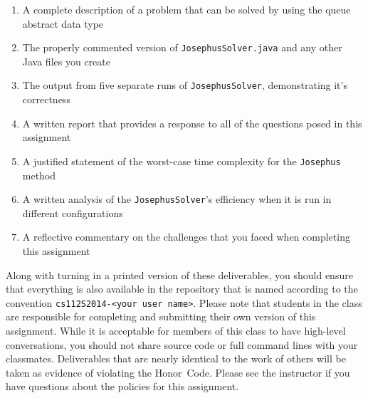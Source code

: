   \begin{enumerate} 
  \itemsep0pt

  \item A complete description of a problem that can be solved by using the queue abstract data type

  \item The properly commented version of {\tt JosephusSolver.java} and any other Java files you create

  \item The output from five separate runs of {\tt JosephusSolver}, demonstrating it's correctness 

  \item A written report that provides a response to all of the questions posed in this assignment

  \item A justified statement of the worst-case time complexity for the {\tt Josephus} method

  \item A written analysis of the {\tt JosephusSolver}'s efficiency when it is run in different configurations 

  \item A reflective commentary on the challenges that you faced when completing this assignment 
   
  \end{enumerate}

  Along with turning in a printed version of these deliverables, you should ensure that everything is also available in
  the repository that is named according to the convention {\tt cs112S2014-<your user name>}. Please note that students
  in the class are responsible for completing and submitting their own version of this assignment.    While it is
  acceptable for members of this class to have high-level conversations, you should not share source code or full
  command lines with your classmates.  Deliverables that are nearly identical to the work of others will be taken as
  evidence of violating the \mbox{Honor Code}.  Please see the instructor if you have questions about the policies for
  this assignment.

  
